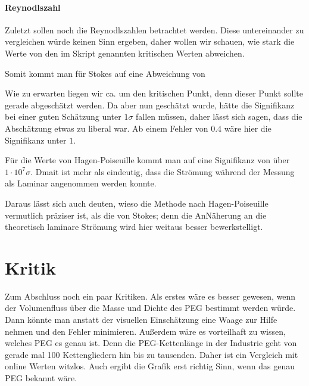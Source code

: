\paragraph{Reynodlszahl}
Zuletzt sollen noch die Reynodlszahlen betrachtet werden. Diese untereinander zu vergleichen würde keinen Sinn ergeben, daher wollen wir schauen, wie stark die Werte von den im Skript genannten kritischen Werten abweichen. \cite{skriptPAP21}

Somit kommt man für Stokes auf eine Abweichung von


Wie zu erwarten liegen wir ca. um den kritischen Punkt, denn dieser Punkt sollte gerade abgeschätzt werden. Da aber nun geschätzt wurde, hätte die Signifikanz bei einer guten Schätzung unter $1\sigma$ fallen müssen, daher lässt sich sagen, dass die Abschätzung etwas zu liberal war. Ab einem Fehler von $0.4$ wäre hier die Signifikanz unter $1$.

Für die Werte von Hagen-Poiseuille kommt man auf eine Signifikanz von über $1 \cdot 10^7 \sigma$. Dmait ist mehr als eindeutig, dass die Strömung während der Messung als Laminar angenommen werden konnte. 

Daraus lässt sich auch deuten, wieso die Methode nach Hagen-Poiseuille vermutlich präziser ist, als die von Stokes; denn die AnNäherung an die theoretisch laminare Strömung wird hier weitaus besser bewerkstelligt. 

\section{Kritik}
Zum Abschluss noch ein paar Kritiken. Als erstes wäre es besser gewesen, wenn der Volumenfluss über die Masse und Dichte des PEG bestimmt werden würde. Dann könnte man anstatt der visuellen Einschätzung eine Waage zur Hilfe nehmen und den Fehler minimieren. 
Außerdem wäre es vorteilhaft zu wissen, welches PEG es genau ist. Denn die PEG-Kettenlänge in der Industrie geht von gerade mal 100 Kettengliedern hin bis zu tausenden. Daher ist ein Vergleich mit online Werten witzlos. Auch ergibt die Grafik  erst richtig Sinn, wenn das genau PEG bekannt wäre.

